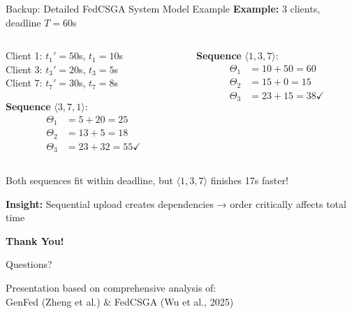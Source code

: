 \documentclass{beamer}
\begin{document}
\begin{frame}{Backup: Detailed FedCSGA System Model Example}
\textbf{Example:} 3 clients, deadline $T=60$s

\begin{columns}
\begin{column}{0.45\textwidth}
Client 1: $t_1'=50$s, $t_1=10$s\\
Client 3: $t_3'=20$s, $t_3=5$s\\
Client 7: $t_7'=30$s, $t_7=8$s

\vspace{0.3cm}
\textbf{Sequence} $\langle 3,7,1 \rangle$:
\begin{align*}
\Theta_1 &= 5+20 = 25 \\
\Theta_2 &= 13+5 = 18 \\
\Theta_3 &= 23+32 = 55 \checkmark
\end{align*}
\end{column}

\begin{column}{0.45\textwidth}
\vspace{1.5cm}

\textbf{Sequence} $\langle 1,3,7 \rangle$:
\begin{align*}
\Theta_1 &= 10+50 = 60 \\
\Theta_2 &= 15+0 = 15 \\
\Theta_3 &= 23+15 = 38 \checkmark
\end{align*}
\end{column}
\end{columns}

\vspace{0.3cm}
Both sequences fit within deadline, but $\langle 1,3,7 \rangle$ finishes 17s faster!

\textbf{Insight:} Sequential upload creates dependencies → order critically affects total time
\end{frame}

\begin{frame}
\begin{center}
\Large \textbf{Thank You!}

\vspace{1cm}

\normalsize
Questions?

\vspace{1cm}

\small
Presentation based on comprehensive analysis of:\\
GenFed (Zheng et al.) \& FedCSGA (Wu et al., 2025)
\end{center}
\end{frame}
\end{document}
